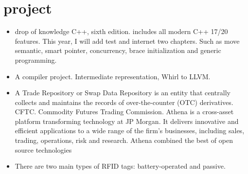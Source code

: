 \documentclass[a4paper,11pt,twoside]{book}
\begin{document}

\section{project}
\begin{itemize}
	\item drop of knowledge C++, sixth edition. includes all modern C++ 17/20 features. This year, I will add test and internet two chapters.  Such as move semantic,  smart pointer, concurrency, brace initialization and generic programming. 
	
	\item A compiler project. Intermediate representation, Whirl to LLVM. 
	
	\item A Trade Repository or Swap Data Repository is an entity that centrally collects and maintains the records of over-the-counter (OTC) derivatives. CFTC. Commodity Futures Trading Commission.   Athena is a cross-asset platform transforming technology at JP Morgan. It delivers innovative and efficient applications to a wide range of the firm's businesses, including sales, trading, operations, risk and research. Athena combined the best of open source technologies
	
	\item There are two main types of RFID tags: battery-operated and passive. 
	


\end{itemize}


\ifx \allfiles \undefined
\end{document}
